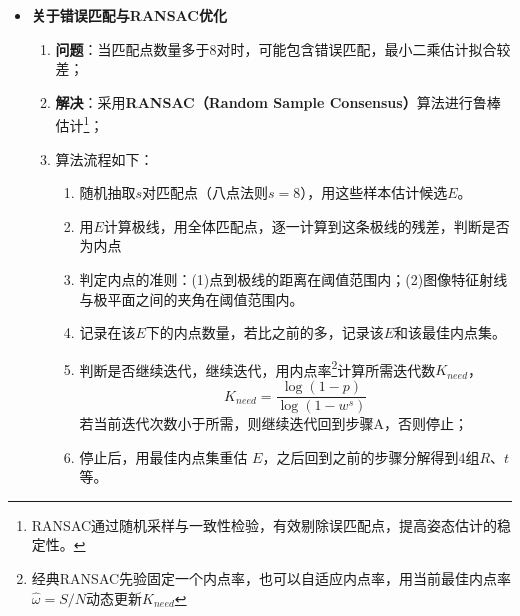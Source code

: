 \documentclass[../main.tex]{subfiles}
\begin{document}
\begin{enumerate}
\begin{itemize}
\begin{enumerate}
\begin{itemize}
\begin{itemize}
\begin{small}
\begin{itemize}
        ==============================
        \item \textbf{关于错误匹配与RANSAC优化}
        \begin{enumerate}
            \item \textbf{问题}：当匹配点数量多于8对时，可能包含错误匹配，最小二乘估计拟合较差；
            \item \textbf{解决}：采用\textbf{RANSAC（Random Sample Consensus）}算法进行鲁棒估计\footnote{RANSAC通过随机采样与一致性检验，有效剔除误匹配点，提高姿态估计的稳定性。}；
            \item 算法流程如下：
            \begin{enumerate}
              \item 随机抽取$s$对匹配点（八点法则$s=8$），用这些样本估计候选$E$。
              \item 用$E$计算极线，用全体匹配点，逐一计算到这条极线的残差，判断是否为内点
              \item 判定内点的准则：(1)点到极线的距离在阈值范围内；(2)图像特征射线与极平面之间的夹角在阈值范围内。
              \item 记录在该$E$下的内点数量，若比之前的多，记录该$E$和该最佳内点集。
              \item 判断是否继续迭代，继续迭代，用内点率\footnote{经典RANSAC先验固定一个内点率，也可以自适应内点率，用当前最佳内点率$\hat\omega=S/N$动态更新$K_{need}$}计算所需迭代数$K_{need}$，
              $$K_{need} = \frac{\log(1-p)}{\log(1-w^s)}$$
              若当前迭代次数小于所需，则继续迭代回到步骤A，否则停止；
              \item 停止后，用最佳内点集重估 \(E\)，之后回到之前的步骤分解得到4组$R$、$t$等。
            \end{enumerate}

\end{enumerate}
\end{itemize}
\end{small}
\end{itemize}
\end{itemize}
\end{enumerate}
\end{itemize}
\end{enumerate}
\end{document}
